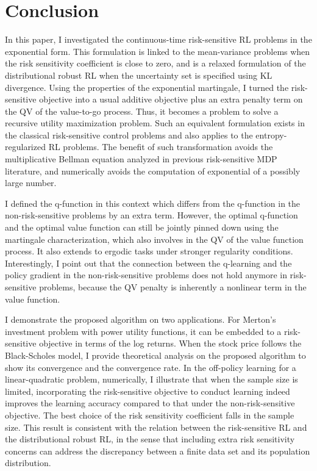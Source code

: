 \section{Conclusion}\label{sec:conclusion}
In this paper, I investigated the continuous-time risk-sensitive RL problems in the exponential form. This formulation is linked to the mean-variance problems when the risk sensitivity coefficient is close to zero, and is a relaxed formulation of the distributional robust RL when the uncertainty set is specified using KL divergence. Using the properties of the exponential martingale, I turned the risk-sensitive objective into a usual additive objective plus an extra penalty term on the QV of the value-to-go process. Thus, it becomes a problem to solve a recursive utility maximization problem. Such an equivalent formulation exists in the classical risk-sensitive control problems and also applies to the entropy-regularized RL problems. The benefit of such transformation avoids the multiplicative Bellman equation analyzed in previous risk-sensitive MDP literature, and numerically avoids the computation of exponential of a possibly large number. 

I defined the q-function in this context which differs from the q-function in the non-risk-sensitive problems \citep{jia2022q} by an extra term. However, the optimal q-function and the optimal value function can still be jointly pinned down using the martingale characterization, which also involves in the QV of the value function process. It also extends to ergodic tasks under stronger regularity conditions. Interestingly, I point out that the connection between the q-learning and the policy gradient in the non-risk-sensitive problems does not hold anymore in risk-sensitive problems, because the QV penalty is inherently a nonlinear term in the value function.  

I demonstrate the proposed algorithm on two applications. For Merton's investment problem with power utility functions, it can be embedded to a risk-sensitive objective in terms of the log returns. When the stock price follows the Black-Scholes model, I provide theoretical analysis on the proposed algorithm to show its convergence and the convergence rate. In the off-policy learning for a linear-quadratic problem, numerically, I illustrate that when the sample size is limited, incorporating the risk-sensitive objective to conduct learning indeed improves the learning accuracy compared to that under the non-risk-sensitive objective. The best choice of the risk sensitivity coefficient falls in the sample size. This result is consistent with the relation between the risk-sensitive RL and the distributional robust RL, in the sense that including extra risk sensitivity concerns can address the discrepancy between a finite data set and its population distribution.

